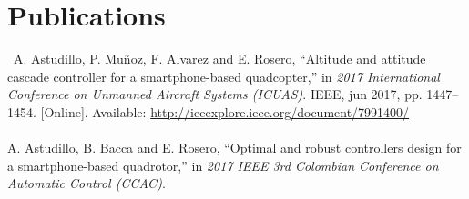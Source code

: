 \chapter*{Publications} \label{publications}

\
A. Astudillo, P. Muñoz, F. Alvarez and E. Rosero, “Altitude and attitude cascade controller for a smartphone-based quadcopter,” in \textit{2017 International Conference on Unmanned Aircraft Systems (ICUAS)}. IEEE, jun 2017, pp. 1447–1454. [Online]. Available: \url{http://ieeexplore.ieee.org/document/7991400/}
\\\\
A. Astudillo, B. Bacca and E. Rosero, “Optimal and robust controllers design for a smartphone-based quadrotor,” in \textit{2017 IEEE 3rd Colombian Conference on Automatic Control (CCAC)}.
\

